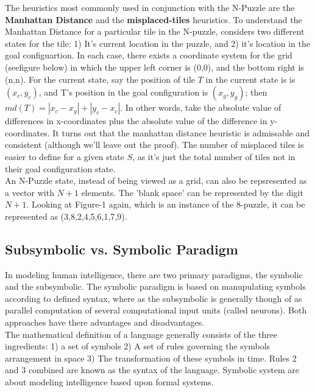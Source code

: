 \documentclass[a4, 12pt]{article}
\begin{document}
The heuristics most commonly used in conjunction with the N-Puzzle are the \textbf{Manhattan Distance} and the \textbf{misplaced-tiles} heuristics. To understand the Manhattan Distance for a particular tile in the N-puzzle, considers two different states for the tile: 1) It's current location in the puzzle, and 2) it's location in the goal configuartion. In each case, there exists a coordinate system for the grid (seefigure below) in which the upper left corner is (0,0), and the bottom right is (n,n). For the current state, say the position of tile $T$ in the current state is is $(x_c, y_c)$, and T's position in the goal configuration is $(x_g, y_g)$; then $md(T) = |x_c - x_g| + |y_c - x_c|$. In other words, take the absolute value of differences in x-coordinates plus the absolute value of the difference in y-coordinates. It turns out that the manhattan distance heuristic is admissable and consistent (although we'll leave out the proof). The number of misplaced tiles is easier to define for a given state $S$, as it's just the total number of tiles not in their goal configuration state. \\


An N-Puzzle state, instead of being viewed as a grid, can also be repsresented as a vector with $N + 1$ elements. The 'blank space' can be represented by the digit $N + 1$.  Looking at Figure-1 again, which is an instance of the 8-puzzle, it can be represented as (3,8,2,4,5,6,1,7,9). 

\subsection{Subsymbolic vs. Symbolic Paradigm}
In modeling human intelligence, there are two primary paradigms, the symbolic and the subsymbolic. The symbolic paradigm is based on manupulating symbols according to defined syntax, where as the subsymbolic is generally though of as parallel computation of several computational input units (called neurons). Both approaches have there advantages and disadvantages.\\

 The mathematical definition of a language generally consists of the three ingredients: 1) a set of symbols 2) A set of rules governing the symbols arrangement in space 3) The transformation of these symbols in time. Rules 2 and 3 combined are known as the syntax of the language. Symbolic system are about modeling intelligence based upon formal systems. \\
\end{document}
